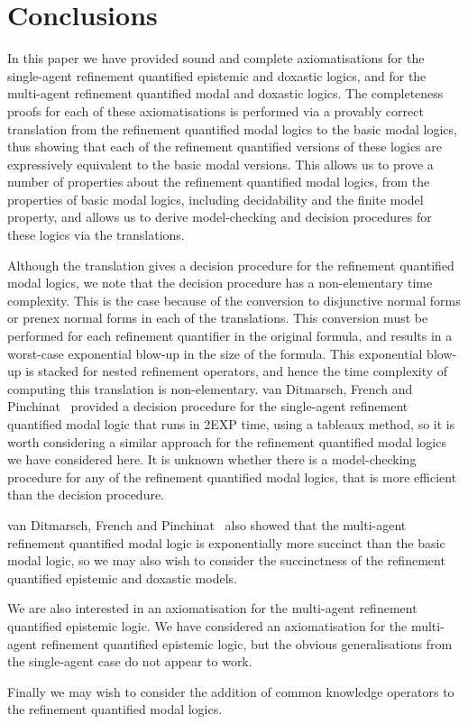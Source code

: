 \chapter{Conclusions}

In this paper we have provided sound and complete axiomatisations for the
single-agent refinement quantified epistemic and doxastic logics, and for the
multi-agent refinement quantified modal and doxastic logics. The completeness
proofs for each of these axiomatisations is performed via a provably correct
translation from the refinement quantified modal logics to the basic modal
logics, thus showing that each of the refinement quantified versions of these
logics are expressively equivalent to the basic modal versions. This allows us
to prove a number of properties about the refinement quantified modal logics,
from the properties of basic modal logics, including decidability and the finite
model property, and allows us to derive model-checking and decision procedures
for these logics via the translations.

Although the translation gives a decision procedure for the refinement
quantified modal logics, we note that the decision procedure has a
non-elementary time complexity. This is the case because of the conversion to
disjunctive normal forms or prenex normal forms in each of the translations.
This conversion must be performed for each refinement quantifier in the original
formula, and results in a worst-case exponential blow-up in the size of the
formula. This exponential blow-up is stacked for nested refinement operators,
and hence the time complexity of computing this translation is non-elementary.
van Ditmarsch, French and Pinchinat~\cite{french2010future} provided a decision
procedure for the single-agent refinement quantified modal logic that runs in
2EXP time, using a tableaux method, so it is worth considering a similar
approach for the refinement quantified modal logics we have considered here.
It is unknown whether there is a model-checking procedure for any of the
refinement quantified modal logics, that is more efficient than the decision
procedure.

van Ditmarsch, French and Pinchinat~\cite{french2010future} also showed
that the multi-agent refinement quantified modal logic is exponentially more
succinct than the basic modal logic, so we may also wish to consider the
succinctness of the refinement quantified epistemic and doxastic models.

We are also interested in an axiomatisation for the multi-agent refinement
quantified epistemic logic. We have considered an axiomatisation for the
multi-agent refinement quantified epistemic logic, but the obvious
generalisations from the single-agent case do not appear to work.

Finally we may wish to consider the addition of common knowledge operators to
the refinement quantified modal logics.
